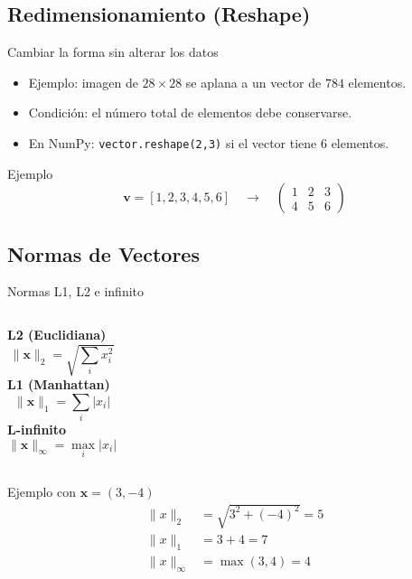 \documentclass[aspectratio=169, 10pt, xcolor=table]{beamer}
\begin{document}
\subsection{Redimensionamiento (Reshape)}

\begin{frame}{Cambiar la forma sin alterar los datos}
    \begin{itemize}
        \item Ejemplo: imagen de $28 \times 28$ se aplana a un vector de $784$ elementos.
        \item Condición: el número total de elementos debe conservarse.
        \item En NumPy: \texttt{vector.reshape(2,3)} si el vector tiene 6 elementos.
    \end{itemize}
    \begin{exampleblock}{Ejemplo}
        \[
        \mathbf{v} = [1,2,3,4,5,6] \quad \rightarrow \quad \begin{pmatrix}1&2&3\\4&5&6\end{pmatrix}
        \]
    \end{exampleblock}
\end{frame}

\subsection{Normas de Vectores}

\begin{frame}{Normas L1, L2 e infinito}
    \begin{columns}[t]
        \textbf{L2 (Euclidiana)}
        \[
        \|\mathbf{x}\|_2 = \sqrt{\sum_i x_i^2}
        \]
        \textbf{L1 (Manhattan)}
        \[
        \|\mathbf{x}\|_1 = \sum_i |x_i|
        \]
        \textbf{L-infinito}
        \[
        \|\mathbf{x}\|_\infty = \max_i |x_i|
        \]
    \end{columns}
    \vspace{0.3cm}
    \begin{exampleblock}{Ejemplo con $\mathbf{x} = (3, -4)$}
        \begin{align*}
            \|x\|_2 &= \sqrt{3^2+(-4)^2}=5 \\
            \|x\|_1 &= 3+4=7 \\
            \|x\|_\infty &= \max(3,4)=4
        \end{align*}
    \end{exampleblock}
\end{frame}
\end{document}
